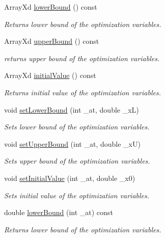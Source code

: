\begin{DoxyCompactItemize}
Array\-Xd \hyperlink{class_c_optimization_problem_a43bb9bd0b393b5dc790967f6019fefc9}{lower\-Bound} () const 
\begin{DoxyCompactList}\small\item\em Returns lower bound of the optimization variables. \end{DoxyCompactList}\item 
Array\-Xd \hyperlink{class_c_optimization_problem_a309631e1082dd7508bbf24cfd6eb8b4b}{upper\-Bound} () const 
\begin{DoxyCompactList}\small\item\em returns upper bound of the optimization variables. \end{DoxyCompactList}\item 
Array\-Xd \hyperlink{class_c_optimization_problem_a1b52c22548bb9057675d343a3ac3cbb4}{initial\-Value} () const 
\begin{DoxyCompactList}\small\item\em Returns initial value of the optimization variables. \end{DoxyCompactList}\item 
void \hyperlink{class_c_optimization_problem_a91430a451c3c8a63ebc9557165a2180e}{set\-Lower\-Bound} (int \-\_\-at, double \-\_\-x\-L)
\begin{DoxyCompactList}\small\item\em Sets lower bound of the optimization variables. \end{DoxyCompactList}\item 
void \hyperlink{class_c_optimization_problem_a310b6d74b2cc7f276185726d7346158b}{set\-Upper\-Bound} (int \-\_\-at, double \-\_\-x\-U)
\begin{DoxyCompactList}\small\item\em Sets upper bound of the optimization variables. \end{DoxyCompactList}\item 
void \hyperlink{class_c_optimization_problem_a96a8e72816d8234cc84504bcbcabdb5a}{set\-Initial\-Value} (int \-\_\-at, double \-\_\-x0)
\begin{DoxyCompactList}\small\item\em Sets initial value of the optimization variables. \end{DoxyCompactList}\item 
double \hyperlink{class_c_optimization_problem_a0efb201cd766f922fb2b7da2e45aa5e7}{lower\-Bound} (int \-\_\-at) const 
\begin{DoxyCompactList}\small\item\em Returns lower bound of the optimization variables. \end{DoxyCompactList}\item 

\end{DoxyCompactItemize}
